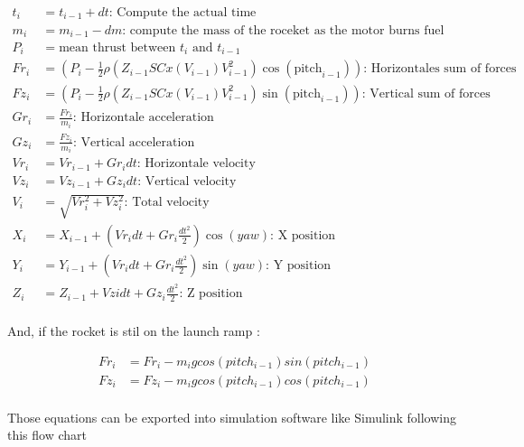 \begin{align*}
    t_i  & = t_{i-1} + dt \text{: Compute the actual time}                                                                        \\
    m_i  & = m_{i-1} - dm \text{: compute the mass of the roceket as the motor burns fuel}                                        \\
    P_i  & = \text{mean thrust between $t_i$ and $t_{i-1}$}                                                                       \\
    Fr_i & = (P_i - \frac{1}{2}\rho(Z_{i-1}SCx(V_{i-1})V^2_{i-1}) \cos({\text{pitch}_{i-1}})) \text{: Horizontales sum of forces} \\
    Fz_i & = (P_i - \frac{1}{2}\rho(Z_{i-1}SCx(V_{i-1})V^2_{i-1}) \sin({\text{pitch}_{i-1}})) \text{: Vertical sum of forces}     \\
    Gr_i & = \frac{Fr_i}{m_i} \text{: Horizontale acceleration}                                                                   \\
    Gz_i & = \frac{Fz_i}{m_i} \text{: Vertical acceleration}                                                                      \\
    Vr_i & = Vr_{i-1} + Gr_i dt \text{: Horizontale velocity}                                                                     \\
    Vz_i & = Vz_{i-1} + Gz_i dt \text{: Vertical velocity}                                                                        \\
    V_i  & = \sqrt{Vr_i^2 + Vz_i^2} \text{: Total velocity}                                                                       \\
    X_i  & = X_{i-1} + (Vr_i dt + Gr_i \frac{dt^2}{2}) \cos({yaw})\text{: X position}                                             \\
    Y_i  & = Y_{i-1} + (Vr_i dt + Gr_i \frac{dt^2}{2}) \sin({yaw}) \text{: Y position}                                            \\
    Z_i  & = Z_{i-1} + Vzi dt + Gz_i \frac{dt^2}{2} \text{: Z position}                                                           \\
\end{align*}

And, if the rocket is stil on the launch ramp :

\begin{align*}
    Fr_i & = Fr_i - m_i g cos({pitch_{i-1}}) sin({pitch_{i-1}}) \\
    Fz_i & = Fz_i - m_i g cos({pitch_{i-1}}) cos({pitch_{i-1}}) \\
\end{align*}

Those equations can be exported into simulation software like Simulink
following this flow chart

